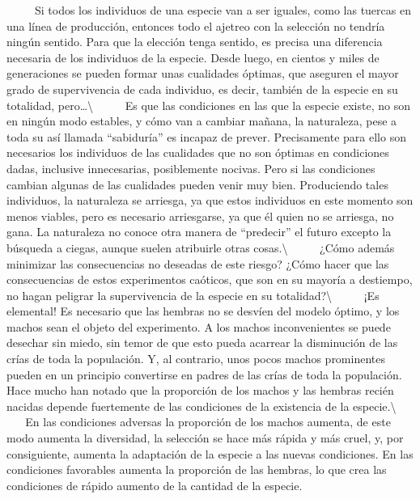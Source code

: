 ~ ~ ~ Si todos los individuos de una especie van a ser iguales, como las
tuercas en una línea de producción, entonces todo el ajetreo con la
selección no tendría ningún sentido. Para que la elección tenga sentido,
es precisa una diferencia necesaria de los individuos de la especie.
Desde luego, en cientos y miles de generaciones se pueden formar unas
cualidades óptimas, que aseguren el mayor grado de supervivencia de cada
individuo, es decir, también de la especie en su totalidad,
pero\ldots{}\textbackslash{} ~ ~ ~ Es que las condiciones en las que la
especie existe, no son en ningún modo estables, y cómo van a cambiar
mañana, la naturaleza, pese a toda su así llamada ``sabiduría'' es
incapaz de prever. Precisamente para ello son necesarios los individuos
de las cualidades que no son óptimas en condiciones dadas, inclusive
innecesarias, posiblemente nocivas. Pero si las condiciones cambian
algunas de las cualidades pueden venir muy bien. Produciendo tales
individuos, la naturaleza se arriesga, ya que estos individuos en este
momento son menos viables, pero es necesario arriesgarse, ya que él
quien no se arriesga, no gana. La naturaleza no conoce otra manera de
``predecir'' el futuro excepto la búsqueda a ciegas, aunque suelen
atribuirle otras cosas.\textbackslash{} ~ ~ ~ ¿Cómo además minimizar las
consecuencias no deseadas de este riesgo? ¿Cómo hacer que las
consecuencias de estos experimentos caóticos, que son en su mayoría a
destiempo, no hagan peligrar la supervivencia de la especie en su
totalidad?\textbackslash{} ~ ~ ~ ¡Es elemental! Es necesario que las
hembras no se desvíen del modelo óptimo, y los machos sean el objeto del
experimento. A los machos inconvenientes se puede desechar sin miedo,
sin temor de que esto pueda acarrear la disminución de las crías de toda
la populación. Y, al contrario, unos pocos machos prominentes pueden en
un principio convertirse en padres de las crías de toda la populación.
Hace mucho han notado que la proporción de los machos y las hembras
recién nacidas depende fuertemente de las condiciones de la existencia
de la especie.\textbackslash{} ~ ~ ~ En las condiciones adversas la
proporción de los machos aumenta, de este modo aumenta la diversidad, la
selección se hace más rápida y más cruel, y, por consiguiente, aumenta
la adaptación de la especie a las nuevas condiciones. En las condiciones
favorables aumenta la proporción de las hembras, lo que crea las
condiciones de rápido aumento de la cantidad de la especie.

